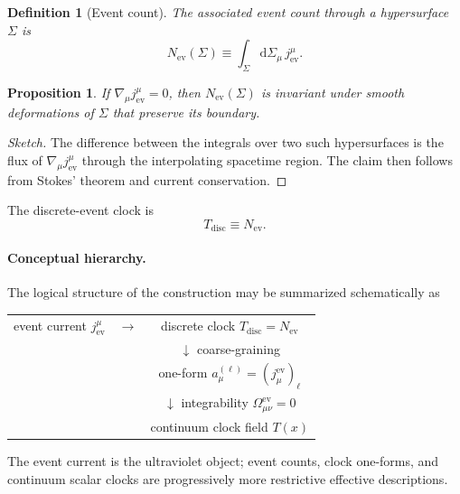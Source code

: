 \documentclass[pdflatex,sn-mathphys-num]{sn-jnl}
\theoremstyle{thmstylethree}
\newtheorem{definition}{Definition}[section]
\theoremstyle{thmstyleone}
\newtheorem{proposition}{Proposition}[section]
\theoremstyle{thmstyletwo}
\numberwithin{equation}{section}
\newcommand{\dd}{\mathrm{d}}
\newcommand{\Sig}{\Sigma}
\newcommand{\Jev}{j^\mu_{\mathrm{ev}}}
\newcommand{\Nev}{N_{\mathrm{ev}}}
\begin{document}
    \begin{definition}[Event count]
The associated event count through a hypersurface $\Sig$ is
\begin{equation}
    \Nev(\Sig) \equiv \int_\Sig \dd\Sigma_\mu\,\Jev .
\end{equation}
    \end{definition}
    
    \begin{proposition}
        If $\nabla_\mu \Jev = 0$, then $\Nev(\Sig)$ is invariant under smooth deformations of $\Sig$ that preserve its boundary.
    \end{proposition}
    
    \begin{proof}[Sketch]
The difference between the integrals over two such hypersurfaces is the flux of $\nabla_\mu j^\mu_{\mathrm{ev}}$ through the interpolating spacetime region. The claim then follows from Stokes' theorem and current conservation.
    \end{proof}
    
    The discrete-event clock is
    \begin{equation}
        T_{\mathrm{disc}} \equiv \Nev .
    \end{equation}
    
    \paragraph{Conceptual hierarchy.}
        The logical structure of the construction may be summarized schematically as
        \begin{center}
            \begin{tabular}{c c c}
                event current $j^\mu_{\mathrm{ev}}$
                & $\longrightarrow$ &
                discrete clock $T_{\mathrm{disc}} = N_{\mathrm{ev}}$ \\
                & &
                $\downarrow$ coarse-graining \\
                & &
                one-form $a^{(\ell)}_\mu=(j^{\mathrm{ev}}_\mu)_\ell$ \\
                & &
                $\downarrow$ integrability $\Omega^{\mathrm{ev}}_{\mu\nu}=0$ \\
                & &
                continuum clock field $T(x)$
            \end{tabular}
        \end{center}
        The event current is the ultraviolet object; event counts, clock one-forms, and continuum scalar clocks are progressively more restrictive effective descriptions.
\end{document}
